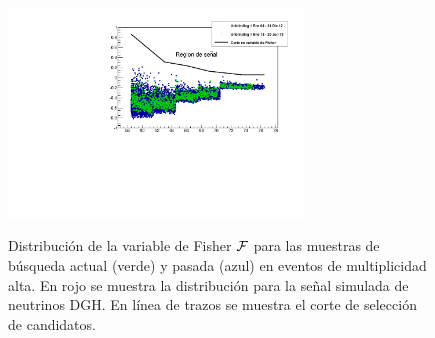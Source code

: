 	\begin{figure}[ht!]
		\begin{center}
			\includegraphics[width=0.7\textwidth]{fig/resultadosAuger/DGL_Unblinding_Thesis}\\
			\caption{\label{fig:unblindingDGL}
			Distribuci\'on de la variable de Fisher $\cal F$ para las muestras de b\'usqueda actual (verde) y pasada (azul) en eventos de multiplicidad alta. En rojo se muestra la distribuci\'on para la se\~nal simulada de neutrinos DGH.
			En l\'inea de trazos se muestra el corte de selecci\'on de candidatos.
			}
		\end{center}
	\end{figure}
	
	
